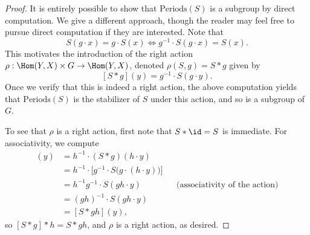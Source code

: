 \documentclass[12nt]{article}
\theoremstyle{plain}
\begin{document}
\begin{proof}
It is entirely possible to show that $\text{Periods}(S)$ is a subgroup by direct computation. We give a different approach, though the reader may feel free to pursue direct computation if they are interested.
Note that \[
S(g \cdot x) = g \cdot S(x) \iff g^{-1} \cdot S(g \cdot x) = S(x).
\]
This motivates the introduction of the right action $\rho : \Hom(Y, X) \times G \to \Hom(Y, X)$, denoted $\rho(S, g) = S * g$ given by
\[
[S * g](y) = g^{-1} \cdot S(g \cdot y).
\]
Once we verify that this is indeed a right action, the above computation yields that $\text{Periods}(S)$ is the stabilizer of $S$ under this action, and so is a subgroup of $G$.

To see that $\rho$ is a right action, first note that $S * \id = S$ is immediate. For associativity, we compute
\begin{align*}
[(S * g) * h](y) &= h^{-1} \cdot (S*g)(h \cdot y) \\
	&= h^{-1} \cdot \Big[ g^{-1} \cdot S\big(g \cdot (h \cdot y) \big) \Big] \\
	&= h^{-1}g^{-1} \cdot S(gh \cdot y) && \text{(associativity of the action)} \\
	&= (gh)^{-1} \cdot S(gh \cdot y) \\
	&= [S * gh](y),
\end{align*}
so $[S * g] * h = S * gh$, and $\rho$ is a right action, as desired. 


\end{proof}
\end{document}
